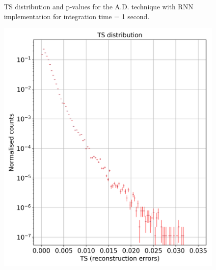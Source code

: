 \begin{figure}[!htb]
\begin{minipage}{0.5\textwidth}
    \end{minipage}
    \caption{TS distribution and p-values for the A.D. technique with RNN implementation for integration time = 1 second.}
    \label{fig:ts-distribution-and-p-values-rnn-it-1}
\end{figure}

\begin{figure}[!htb]
    \centering
    \begin{minipage}{0.5\textwidth}
        \centering
        \includegraphics[width=\linewidth]{figures/experiments/p_val/model_6/ts_distribution_bins_100.png}
    \end{minipage}%
    \begin{minipage}{0.5\textwidth}
        \centering

\end{minipage}
\end{figure}

